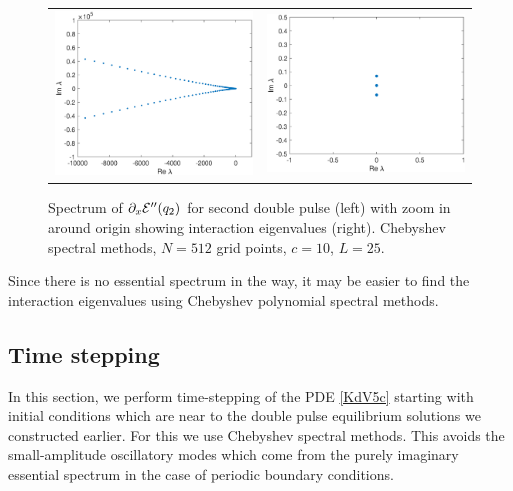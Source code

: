 \documentclass[thesis.tex]{subfiles}
\begin{document}
\begin{figure}[H]
\begin{center}
\begin{tabular}{cc}
\includegraphics[width=6cm]{images/kdv5numerics/double2speccheb} &
\includegraphics[width=6cm]{images/kdv5numerics/double2specchebzoom.eps} \\
\end{tabular}
\caption{Spectrum of $\partial_x \mathcal{E}''(q_2)$ for second double pulse (left) with zoom in around origin showing interaction eigenvalues (right). Chebyshev spectral methods, $N = 512$ grid points, $c = 10$, $L = 25$.}
\label{fig:KdV5speccheb}
\end{center}
\end{figure}

Since there is no essential spectrum in the way, it may be easier to find the interaction eigenvalues using Chebyshev polynomial spectral methods.

\subsection{Time stepping}

In this section, we perform time-stepping of the PDE \eqref{KdV5c} starting with initial conditions which are near to the double pulse equilibrium solutions we constructed earlier. For this we use Chebyshev spectral methods. This avoids the small-amplitude oscillatory modes which come from the purely imaginary essential spectrum in the case of periodic boundary conditions.
\end{document}
